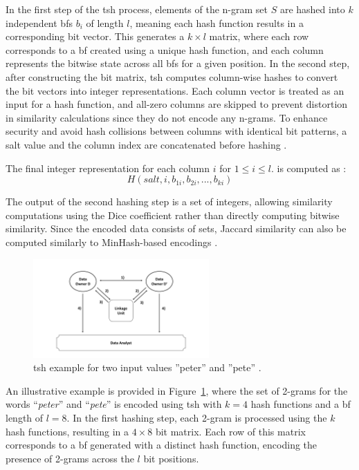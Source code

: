 In the first step of the \ac{tsh} process, elements of the n-gram set \(S\) are hashed into \(k\) independent \ac{bf}s \(b_i\) of length \(l\), meaning each hash function results in a corresponding bit vector.
This generates a \(k \times l\) matrix, where each row corresponds to a \ac{bf} created using a unique hash function, and each column represents the bitwise state across all \ac{bf}s for a given position.
In the second step, after constructing the bit matrix, \ac{tsh} computes column-wise hashes to convert the bit vectors into integer representations.
Each column vector is treated as an input for a hash function, and all-zero columns are skipped to prevent distortion in similarity calculations since they do not encode any n-grams.
To enhance security and avoid hash collisions between columns with identical bit patterns, a salt value and the column index are concatenated before hashing \cite{ranbaduge2020secure}.

The final integer representation for each column $i$ for $1 \leq i \leq l$. is computed as \cite{schaefer2024, ranbaduge2020secure}:
\begin{equation}
    H(salt, i, b_{1i}, b_{2i}, ..., b_{ki})
\end{equation}

The output of the second hashing step is a set of integers, allowing similarity computations using the Dice coefficient rather than directly computing bitwise similarity.
Since the encoded data consists of sets, Jaccard similarity can also be computed similarly to MinHash-based encodings \cite{ranbaduge2020secure}.

\begin{figure}[H]
  \centering
  \includegraphics[width=0.6\textwidth, page=8]{img/visualization.pdf}
  \caption{\ac{tsh} example for two input values ''peter'' and ''pete'' \cite{ranbaduge2020secure}.}
  \label{fig:tshexample}
\end{figure}

An illustrative example is provided in Figure~\ref{fig:tshexample}, where the set of 2-grams for the words ``\textit{peter}'' and ``\textit{pete}'' is encoded using \ac{tsh} with $k = 4$ hash functions and a \ac{bf} length of $l = 8$.
In the first hashing step, each 2-gram is processed using the $k$ hash functions, resulting in a $4 \times 8$ bit matrix.
Each row of this matrix corresponds to a \ac{bf} generated with a distinct hash function, encoding the presence of 2-grams across the $l$ bit positions.

